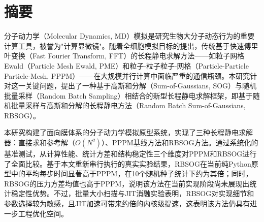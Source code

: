 \fi

\chapter*{摘\quad 要}%
\setcounter{page}{1}%

分子动力学（Molecular Dynamics, MD）模拟是研究生物大分子动态行为的重要计算工具，被誉为"计算显微镜"。随着全细胞模拟目标的提出，传统基于快速傅里叶变换（Fast Fourier Transform, FFT）的长程静电求解方法——如粒子网格Ewald（Particle Mesh Ewald, PME）和粒子-粒子粒子-网格（Particle-Particle Particle-Mesh, PPPM）——在大规模并行计算中面临严重的通信瓶颈。本研究针对这一关键问题，提出了一种基于高斯和分解（Sum-of-Gaussians, SOG）与随机批量采样（Random Batch Sampling）相结合的新型长程静电求解框架，即基于随机批量采样与高斯和分解的长程静电方法（Random Batch Sum-of-Gaussians, RBSOG）。

本研究构建了面向膜体系的分子动力学模拟原型系统，实现了三种长程静电求解器：直接求和参考解（$O(N^2)$）、PPPM基线方法和RBSOG方法。通过系统化的基准测试，从计算性能、统计方差和结构稳定性三个维度对PPPM和RBSOG进行了全面比较。基于本文重新串行执行的真实实验结果，RBSOG在当前纯Python原型中的平均每步时间显著高于PPPM，在10个随机种子统计下约为其\RBSOGSlowdownVsPPPM 倍；同时，RBSOG的压力方差均值也高于PPPM，说明该方法在当前实现阶段尚未展现出统计稳定性优势。不过，批量大小扫描与JIT消融实验表明，RBSOG对实现细节和参数选择较为敏感，且JIT加速可带来约\JITSpeedup 倍的内核级提速，这表明该方法仍具有进一步工程优化空间。

